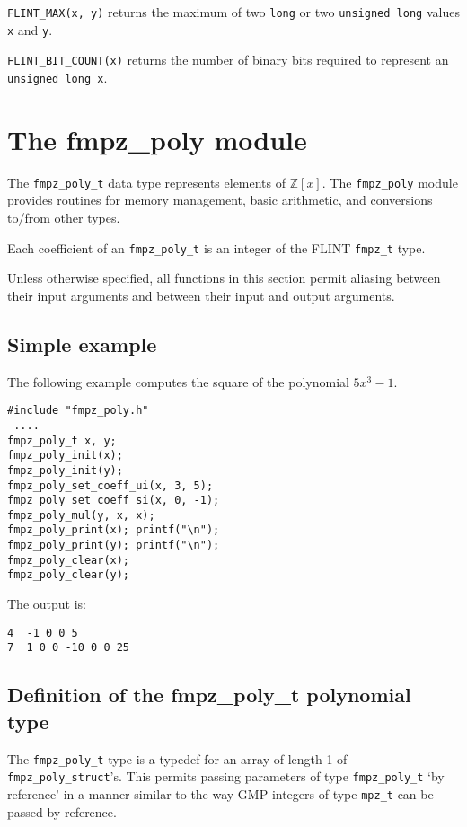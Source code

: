 \documentclass[a4paper,10pt]{article}
\newcommand{\Z}{\mathbb{Z}}
\newcommand{\code}{\lstinline}
\begin{document}
\code{FLINT_MAX(x, y)} returns the maximum of two \code{long} or two \code{unsigned long} values \code{x} and \code{y}.

\code{FLINT_BIT_COUNT(x)} returns the number of binary bits required to represent an \code{unsigned long x}.

\section{The fmpz\_poly module}

The \code{fmpz_poly_t} data type represents elements of $\Z[x]$. The \code{fmpz_poly} module provides routines for memory management, basic arithmetic, and conversions to/from other types.

Each coefficient of an \code{fmpz_poly_t} is an integer of the FLINT \code{fmpz_t} type. 

Unless otherwise specified, all functions in this section permit aliasing between their input arguments and between their input and output arguments. 

\subsection{Simple example}

The following example computes the square of the polynomial $5x^3 - 1$.

\begin{lstlisting}
#include "fmpz_poly.h"
 ....
fmpz_poly_t x, y;
fmpz_poly_init(x);
fmpz_poly_init(y);
fmpz_poly_set_coeff_ui(x, 3, 5);
fmpz_poly_set_coeff_si(x, 0, -1);
fmpz_poly_mul(y, x, x);
fmpz_poly_print(x); printf("\n");
fmpz_poly_print(y); printf("\n");
fmpz_poly_clear(x);
fmpz_poly_clear(y);
\end{lstlisting}

The output is:

\begin{lstlisting}
4  -1 0 0 5
7  1 0 0 -10 0 0 25
\end{lstlisting}

\subsection{Definition of the fmpz\_poly\_t polynomial type}

The \code{fmpz_poly_t} type is a typedef for an array of length 1 of \code{fmpz_poly_struct}'s. This permits passing parameters  of type \code{fmpz_poly_t} `by reference' in a manner similar to the way GMP integers of type \code{mpz_t} can be passed by reference. 
\end{document}
